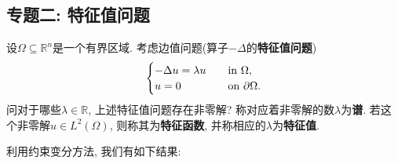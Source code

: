 \subsection{专题二: 特征值问题}

设$\Omega \subseteq \mathbb{R}^n$是一个有界区域. 考虑边值问题(算子$-\Delta$的\textbf{特征值问题}) 
\begin{equation}\label{43}
    \begin{cases}
        -\Delta u = \lambda u \quad &{\rm in}\ \Omega, \\ 
        u = 0 \quad &{\rm on}\ \partial\Omega.
    \end{cases}
\end{equation}
问对于哪些$\lambda \in \mathbb{R}$, 上述特征值问题存在非零解? 
称对应着非零解的数$\lambda$为\textbf{谱}. 若这个非零解$u \in L^2(\Omega)$, 则称其为\textbf{特征函数}, 并称相应的$\lambda$为\textbf{特征值}.

利用约束变分方法, 我们有如下结果:

